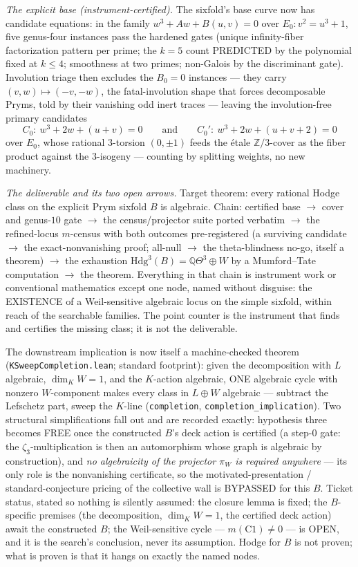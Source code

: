 \documentclass[11pt]{article}
\theoremstyle{definition}
\theoremstyle{remark}
\begin{document}
\emph{The explicit base (instrument-certified).}  The sixfold's base
curve now has candidate equations: in the family
$w^3+Aw+B(u,v)=0$ over $E_0:v^2=u^3+1$, five genus-four instances pass
the hardened gates (unique infinity-fiber factorization pattern per
prime; the $k=5$ count PREDICTED by the polynomial fixed at $k\le4$;
smoothness at two primes; non-Galois by the discriminant gate).
Involution triage then excludes the $B_0=0$ instances --- they carry
$(v,w)\mapsto(-v,-w)$, the fatal-involution shape that forces
decomposable Pryms, told by their vanishing odd inert traces --- leaving
the involution-free primary candidates
\[
  C_0:\ w^3+2w+(u+v)=0
  \qquad\text{and}\qquad
  C_0':\ w^3+2w+(u+v+2)=0
\]
over $E_0$, whose rational $3$-torsion $(0,\pm1)$ feeds the \'etale
$\mathbb Z/3$-cover as the fiber product against the $3$-isogeny ---
counting by splitting weights, no new machinery.

\emph{The deliverable and its two open arrows.}  Target theorem: every
rational Hodge class on the explicit Prym sixfold $B$ is algebraic.
Chain: certified base $\to$ cover and genus-$10$ gate $\to$ the
census/projector suite ported verbatim $\to$ the refined-locus
$m$-census with both outcomes pre-registered (a surviving candidate
$\to$ the exact-nonvanishing proof; all-null $\to$ the theta-blindness
no-go, itself a theorem) $\to$ the exhaustion
$\mathrm{Hdg}^3(B)=\mathbb Q\Theta^3\oplus W$ by a Mumford--Tate
computation $\to$ the theorem.  Everything in that chain is instrument
work or conventional mathematics except one node, named without
disguise: the EXISTENCE of a Weil-sensitive algebraic locus on the
simple sixfold, within reach of the searchable families.  The point
counter is the instrument that finds and certifies the missing class;
it is not the deliverable.

The downstream implication is now itself a machine-checked theorem
(\texttt{KSweepCompletion.lean}; standard footprint): given the
decomposition with $L$ algebraic, $\dim_K W=1$, and the $K$-action
algebraic, ONE algebraic cycle with nonzero $W$-component makes every
class in $L\oplus W$ algebraic --- subtract the Lefschetz part, sweep
the $K$-line (\texttt{completion},
\texttt{completion\_implication}).  Two structural simplifications fall
out and are recorded exactly: hypothesis three becomes FREE once the
constructed $B$'s deck action is certified (a step-0 gate: the
$\zeta_3$-multiplication is then an automorphism whose graph is
algebraic by construction), and \emph{no algebraicity of the projector
$\pi_W$ is required anywhere} --- its only role is the nonvanishing
certificate, so the motivated-presentation / standard-conjecture pricing
of the collective wall is BYPASSED for this $B$.  Ticket status, stated
so nothing is silently assumed: the closure lemma is fixed; the
$B$-specific premises (the decomposition, $\dim_K W=1$, the certified
deck action) await the constructed $B$; the Weil-sensitive cycle ---
$m(\mathrm{C1})\neq0$ --- is OPEN, and it is the search's conclusion,
never its assumption.  Hodge for $B$ is not proven; what is proven is
that it hangs on exactly the named nodes.
\end{document}
